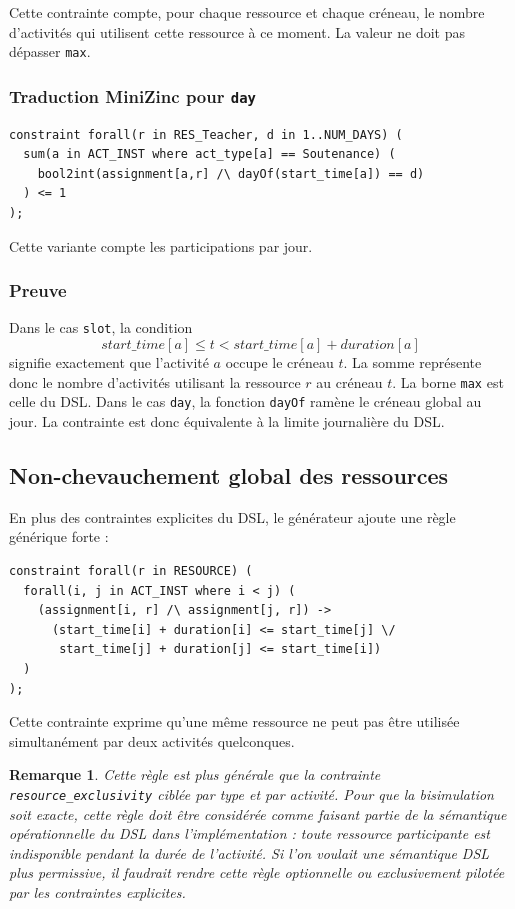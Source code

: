 \documentclass[12pt,a4paper]{article}
\newtheorem{remark}{Remarque}[section]
\begin{document}
Cette contrainte compte, pour chaque ressource et chaque créneau, le nombre d'activités qui utilisent cette ressource à ce moment. La valeur ne doit pas dépasser \texttt{max}.

\subsubsection*{Traduction MiniZinc pour \texttt{day}}

\begin{lstlisting}[language=MiniZinc]
constraint forall(r in RES_Teacher, d in 1..NUM_DAYS) (
  sum(a in ACT_INST where act_type[a] == Soutenance) (
    bool2int(assignment[a,r] /\ dayOf(start_time[a]) == d)
  ) <= 1
);
\end{lstlisting}

Cette variante compte les participations par jour.

\subsubsection*{Preuve}

Dans le cas \texttt{slot}, la condition
\[
start\_time[a] \leq t < start\_time[a] + duration[a]
\]
signifie exactement que l'activité $a$ occupe le créneau $t$. La somme représente donc le nombre d'activités utilisant la ressource $r$ au créneau $t$. La borne \texttt{max} est celle du DSL. Dans le cas \texttt{day}, la fonction \texttt{dayOf} ramène le créneau global au jour. La contrainte est donc équivalente à la limite journalière du DSL.

\subsection{Non-chevauchement global des ressources}

En plus des contraintes explicites du DSL, le générateur ajoute une règle générique forte :

\begin{lstlisting}[language=MiniZinc]
constraint forall(r in RESOURCE) (
  forall(i, j in ACT_INST where i < j) (
    (assignment[i, r] /\ assignment[j, r]) ->
      (start_time[i] + duration[i] <= start_time[j] \/
       start_time[j] + duration[j] <= start_time[i])
  )
);
\end{lstlisting}

Cette contrainte exprime qu'une même ressource ne peut pas être utilisée simultanément par deux activités quelconques.

\begin{remark}
Cette règle est plus générale que la contrainte \texttt{resource\_exclusivity} ciblée par type et par activité. Pour que la bisimulation soit exacte, cette règle doit être considérée comme faisant partie de la sémantique opérationnelle du DSL dans l'implémentation : toute ressource participante est indisponible pendant la durée de l'activité. Si l'on voulait une sémantique DSL plus permissive, il faudrait rendre cette règle optionnelle ou exclusivement pilotée par les contraintes explicites.
\end{remark}
\end{document}
